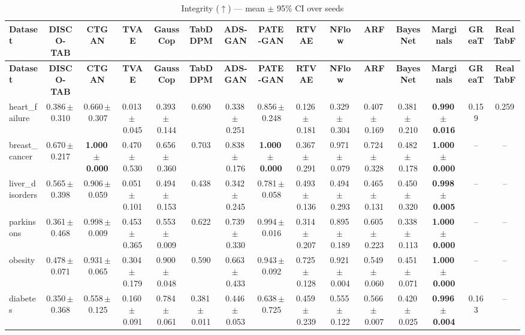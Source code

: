 \documentclass[8pt]{extarticle}
\begin{document}
\begin{longtable}{l*{14}{c}}
\caption{Integrity ($\uparrow$) --- mean $\pm$ 95\% CI over seeds}\\
\toprule
\textbf{Dataset} & \textbf{DISCO-TAB} & \textbf{CTGAN} & \textbf{TVAE} & \textbf{GaussCop} & \textbf{TabDDPM} & \textbf{ADS-GAN} & \textbf{PATE-GAN} & \textbf{RTVAE} & \textbf{NFlow} & \textbf{ARF} & \textbf{BayesNet} & \textbf{Marginals} & \textbf{GReaT} & \textbf{RealTabF} \\
\midrule
\endfirsthead
\toprule
\textbf{Dataset} & \textbf{DISCO-TAB} & \textbf{CTGAN} & \textbf{TVAE} & \textbf{GaussCop} & \textbf{TabDDPM} & \textbf{ADS-GAN} & \textbf{PATE-GAN} & \textbf{RTVAE} & \textbf{NFlow} & \textbf{ARF} & \textbf{BayesNet} & \textbf{Marginals} & \textbf{GReaT} & \textbf{RealTabF} \\
\midrule
\endhead
\bottomrule
\endfoot
heart\_failure & 0.386\,$\pm$\,0.310 & 0.660\,$\pm$\,0.307 & 0.013\,$\pm$\,0.045 & 0.393\,$\pm$\,0.144 & 0.690 & 0.338\,$\pm$\,0.251 & 0.856\,$\pm$\,0.248 & 0.126\,$\pm$\,0.181 & 0.329\,$\pm$\,0.304 & 0.407\,$\pm$\,0.169 & 0.381\,$\pm$\,0.210 & \textbf{0.990\,$\pm$\,0.016} & 0.159 & 0.259 \\
breast\_cancer & 0.670\,$\pm$\,0.217 & \textbf{1.000\,$\pm$\,0.000} & 0.470\,$\pm$\,0.530 & 0.656\,$\pm$\,0.360 & 0.703 & 0.838\,$\pm$\,0.176 & \textbf{1.000\,$\pm$\,0.000} & 0.367\,$\pm$\,0.291 & 0.971\,$\pm$\,0.079 & 0.724\,$\pm$\,0.328 & 0.482\,$\pm$\,0.178 & \textbf{1.000\,$\pm$\,0.000} & -- & -- \\
liver\_disorders & 0.565\,$\pm$\,0.398 & 0.906\,$\pm$\,0.059 & 0.051\,$\pm$\,0.101 & 0.494\,$\pm$\,0.153 & 0.438 & 0.342\,$\pm$\,0.245 & 0.781\,$\pm$\,0.058 & 0.493\,$\pm$\,0.136 & 0.494\,$\pm$\,0.293 & 0.465\,$\pm$\,0.131 & 0.450\,$\pm$\,0.320 & \textbf{0.998\,$\pm$\,0.005} & -- & -- \\
parkinsons & 0.361\,$\pm$\,0.468 & 0.998\,$\pm$\,0.009 & 0.453\,$\pm$\,0.365 & 0.553\,$\pm$\,0.009 & 0.622 & 0.739\,$\pm$\,0.330 & 0.994\,$\pm$\,0.016 & 0.314\,$\pm$\,0.207 & 0.895\,$\pm$\,0.189 & 0.605\,$\pm$\,0.223 & 0.338\,$\pm$\,0.113 & \textbf{1.000\,$\pm$\,0.000} & -- & -- \\
obesity & 0.478\,$\pm$\,0.071 & 0.931\,$\pm$\,0.065 & 0.304\,$\pm$\,0.179 & 0.900\,$\pm$\,0.048 & 0.590 & 0.663\,$\pm$\,0.433 & 0.943\,$\pm$\,0.092 & 0.725\,$\pm$\,0.128 & 0.921\,$\pm$\,0.004 & 0.549\,$\pm$\,0.060 & 0.451\,$\pm$\,0.071 & \textbf{1.000\,$\pm$\,0.000} & -- & -- \\
diabetes & 0.350\,$\pm$\,0.368 & 0.558\,$\pm$\,0.125 & 0.160\,$\pm$\,0.091 & 0.784\,$\pm$\,0.061 & 0.381\,$\pm$\,0.011 & 0.446\,$\pm$\,0.053 & 0.638\,$\pm$\,0.725 & 0.459\,$\pm$\,0.239 & 0.555\,$\pm$\,0.122 & 0.566\,$\pm$\,0.007 & 0.420\,$\pm$\,0.025 & \textbf{0.996\,$\pm$\,0.004} & 0.163 & -- \\

\end{longtable}
\end{document}

